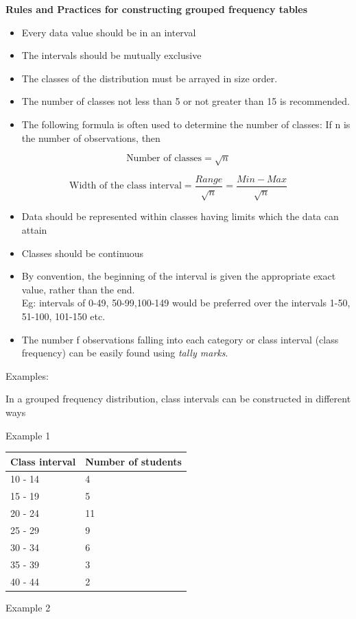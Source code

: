 \documentclass[]{book}
\providecommand{\tightlist}{%
  \setlength{\itemsep}{0pt}\setlength{\parskip}{0pt}}
\begin{document}
\textbf{Rules and Practices for constructing grouped frequency tables}

\begin{itemize}
\tightlist
\item
  Every data value should be in an interval
\item
  The intervals should be mutually exclusive
\item
  The classes of the distribution must be arrayed in size order.
\item
  The number of classes not less than 5 or not greater than 15 is recommended.
\item
  The following formula is often used to determine the number of classes:
  If n is the number of observations, then
\end{itemize}

\[\text{Number of classes} = \sqrt{n}\]

\[\text{Width of the class interval} = \frac{Range}{\sqrt{n}}= \frac{Min-Max}{\sqrt{n}}\]

\begin{itemize}
\tightlist
\item
  Data should be represented within classes having limits which the data can attain
\item
  Classes should be continuous
\item
  By convention, the beginning of the interval is given the appropriate exact value, rather than the end.\\
  Eg: intervals of 0-49, 50-99,100-149 would be preferred over the intervals 1-50, 51-100, 101-150 etc.
\item
  The number f observations falling into each category or class interval (class frequency) can be easily found using \emph{tally marks}.
\end{itemize}

Examples:

In a grouped frequency distribution, class intervals can be constructed in different ways

Example 1

\begin{longtable}[]{@{}ll@{}}
\toprule
Class interval & Number of students\tabularnewline
\midrule
\endhead
10 - 14 & 4\tabularnewline
15 - 19 & 5\tabularnewline
20 - 24 & 11\tabularnewline
25 - 29 & 9\tabularnewline
30 - 34 & 6\tabularnewline
35 - 39 & 3\tabularnewline
40 - 44 & 2\tabularnewline
\bottomrule
\end{longtable}

Example 2
\end{document}

